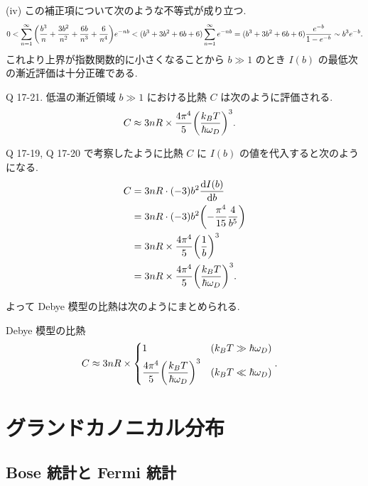 \documentclass[uplatex,dvipdfmx,a4paper,11pt]{jlreq}
\theoremstyle{definition}
\begin{document}
(iv)
この補正項について次のような不等式が成り立つ.
\begin{align}
  0 < \sum_{n=1}^{\infty}\qty(\frac{b^3}{n} + \frac{3b^2}{n^2} + \frac{6b}{n^3} + \frac{6}{n^4})e^{-nb} < (b^3 + 3b^2 + 6b + 6)\sum_{n=1}^{\infty}e^{-nb} = (b^3 + 3b^2 + 6b + 6)\frac{e^{-b}}{1 - e^{-b}}\sim b^3e^{-b}.
\end{align}
これより上界が指数関数的に小さくなることから $b\gg 1$ のとき $I(b)$ の最低次の漸近評価は十分正確である.
\begin{itembox}[l]{Q 17-21.}
  低温の漸近領域 $b\gg 1$ における比熱 $C$ は次のように評価される.
  \begin{align}
    C & \approx 3nR\times\frac{4\pi^4}{5}\qty(\frac{k_BT}{\hbar\omega_D})^3.
  \end{align}
\end{itembox}
Q 17-19, Q 17-20 で考察したように比熱 $C$ に $I(b)$ の値を代入すると次のようになる.
\begin{align}
  C & = 3nR\cdot(-3)b^2\dv{I(b)}{b}                                  \\
    & = 3nR\cdot(-3)b^2\qty(-\frac{\pi^4}{15}\frac{4}{b^5})          \\
    & = 3nR\times\frac{4\pi^4}{5}\qty(\frac{1}{b})^3                 \\
    & = 3nR\times\frac{4\pi^4}{5}\qty(\frac{k_BT}{\hbar\omega_D})^3.
\end{align}

よって Debye 模型の比熱は次のようにまとめられる.
\begin{itembox}[l]{Debye 模型の比熱}
  \begin{align}
    C & \approx 3nR\times\begin{dcases}
                           1                                                  & (k_BT\gg \hbar\omega_D) \\
                           \frac{4\pi^4}{5}\qty(\frac{k_BT}{\hbar\omega_D})^3 & (k_BT\ll \hbar\omega_D)
                         \end{dcases}.
  \end{align}
\end{itembox}




\section{グランドカノニカル分布}

\subsection{Bose 統計と Fermi 統計}
\end{document}
